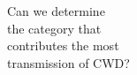 \documentclass[preview]{standalone}
\begin{document}
\begin{center}
Can we determine\\the category that\\contributes the most\\transmission of CWD?
\end{center}
\end{document}
